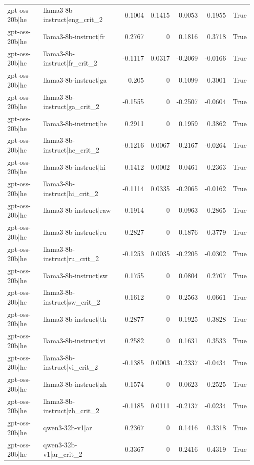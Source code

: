 \begin{table}
\begin{tabular}{l l r r r r l}
gpt-oss-20b|he & llama3-8b-instruct|eng_crit_2 & 0.1004 & 0.1415 & 0.0053 & 0.1955 & True \\
gpt-oss-20b|he & llama3-8b-instruct|fr & 0.2767 & 0 & 0.1816 & 0.3718 & True \\
gpt-oss-20b|he & llama3-8b-instruct|fr_crit_2 & -0.1117 & 0.0317 & -0.2069 & -0.0166 & True \\
gpt-oss-20b|he & llama3-8b-instruct|ga & 0.205 & 0 & 0.1099 & 0.3001 & True \\
gpt-oss-20b|he & llama3-8b-instruct|ga_crit_2 & -0.1555 & 0 & -0.2507 & -0.0604 & True \\
gpt-oss-20b|he & llama3-8b-instruct|he & 0.2911 & 0 & 0.1959 & 0.3862 & True \\
gpt-oss-20b|he & llama3-8b-instruct|he_crit_2 & -0.1216 & 0.0067 & -0.2167 & -0.0264 & True \\
gpt-oss-20b|he & llama3-8b-instruct|hi & 0.1412 & 0.0002 & 0.0461 & 0.2363 & True \\
gpt-oss-20b|he & llama3-8b-instruct|hi_crit_2 & -0.1114 & 0.0335 & -0.2065 & -0.0162 & True \\
gpt-oss-20b|he & llama3-8b-instruct|raw & 0.1914 & 0 & 0.0963 & 0.2865 & True \\
gpt-oss-20b|he & llama3-8b-instruct|ru & 0.2827 & 0 & 0.1876 & 0.3779 & True \\
gpt-oss-20b|he & llama3-8b-instruct|ru_crit_2 & -0.1253 & 0.0035 & -0.2205 & -0.0302 & True \\
gpt-oss-20b|he & llama3-8b-instruct|sw & 0.1755 & 0 & 0.0804 & 0.2707 & True \\
gpt-oss-20b|he & llama3-8b-instruct|sw_crit_2 & -0.1612 & 0 & -0.2563 & -0.0661 & True \\
gpt-oss-20b|he & llama3-8b-instruct|th & 0.2877 & 0 & 0.1925 & 0.3828 & True \\
gpt-oss-20b|he & llama3-8b-instruct|vi & 0.2582 & 0 & 0.1631 & 0.3533 & True \\
gpt-oss-20b|he & llama3-8b-instruct|vi_crit_2 & -0.1385 & 0.0003 & -0.2337 & -0.0434 & True \\
gpt-oss-20b|he & llama3-8b-instruct|zh & 0.1574 & 0 & 0.0623 & 0.2525 & True \\
gpt-oss-20b|he & llama3-8b-instruct|zh_crit_2 & -0.1185 & 0.0111 & -0.2137 & -0.0234 & True \\
gpt-oss-20b|he & qwen3-32b-v1|ar & 0.2367 & 0 & 0.1416 & 0.3318 & True \\
gpt-oss-20b|he & qwen3-32b-v1|ar_crit_2 & 0.3367 & 0 & 0.2416 & 0.4319 & True \\

\end{tabular}
\end{table}
